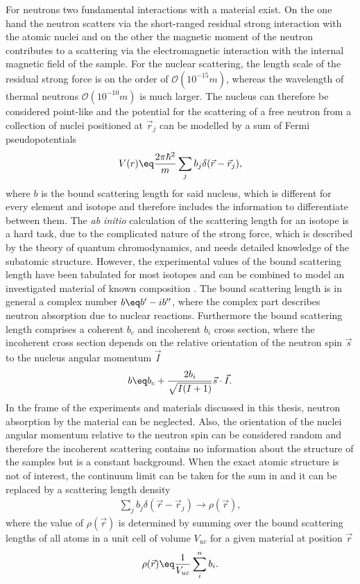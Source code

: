 \documentclass[\main/dresen_thesis.tex]{subfiles}
\begin{document}
For neutrons two fundamental interactions with a material exist.
On the one hand the neutron scatters via the short-ranged residual strong interaction with the atomic nuclei and on the other the magnetic moment of the neutron contributes to a scattering via the electromagnetic interaction with the internal magnetic field of the sample.
For the nuclear scattering, the length scale of the residual strong force is on the order of $\mathcal{O} (10^{-15} \unit{m})$, whereas the wavelength of thermal neutrons $\mathcal{O} (10^{-10} \unit{m})$ is much larger.
The nucleus can therefore be considered point-like and the potential for the scattering of a free neutron from a collection of nuclei positioned at $\vec{r}_j$ can be modelled by a sum of Fermi pseudopotentials
\begin{align}
  V(r) \eq \frac{2 \pi \hbar^2}{m} \sum_j b_j \delta(\vec{r} - \vec{r}_j),\label{eq:theoreticalBackground:scattering:scatteringTheory:neutronScatteringPotentialSum}
 \end{align}
where $b$ is the bound scattering length for said nucleus, which is different for every element and isotope and therefore includes the  information to differentiate between them.
The \textit{ab initio} calculation of the scattering length for an isotope is a hard task, due to the complicated nature of the strong force, which is described by the theory of quantum chromodynamics, and needs detailed knowledge of the subatomic structure.
However, the experimental values of the bound scattering length have been tabulated for most isotopes and can be combined to model an investigated material of known composition \cite{Sears_1992_Neutr}.
The bound scattering length is in general a complex number $b \eq b^\prime - i b^{\prime \prime}$, where the complex part describes neutron absorption due to nuclear reactions.
Furthermore the bound scattering length comprises a coherent $b_c$ and incoherent $b_i$ cross section, where the incoherent cross section depends on the relative orientation of the neutron spin $\vec{s}$ to the nucleus angular momentum $\vec{I}$
\begin{align}
  b \eq b_c + \frac{2 b_i}{\sqrt{I(I+1)}} \vec{s} \cdot \vec{I}.
\end{align}
In the frame of the experiments and materials discussed in this thesis, neutron absorption by the material can be neglected.
Also, the orientation of the nuclei angular momentum relative to the neutron spin can be considered random and therefore the incoherent scattering contains no information about the structure of the samples but is a constant background.
When the exact atomic structure is not of interest, the continuum limit can be taken for the sum in  and it can be replaced by a scattering length density
\begin{align}
  \sum_j b_j \delta(\vec{r} - \vec{r}_j) \rightarrow \rho(\vec{r}),
\end{align}
where the value of $\rho(\vec{r})$ is determined by summing over the bound scattering lengths of all atoms in a unit cell of volume $V_{uc}$ for a given material at position $\vec{r}$
\begin{align}
  \rho(\vec{r}) \eq \frac{1}{V_{uc}} \sum_i^n b_i.
\end{align}
\end{document}

